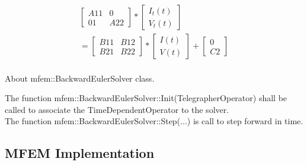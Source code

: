 \documentclass[12pt, letterpaper]{article}
\begin{document}
\begin{equation}
\begin{aligned}
		\begin{bmatrix}
			A11 & 0\\
           01 & A22
		\end{bmatrix}
		*
		\begin{bmatrix}
			I_{t}(t) \\
			V_{t}(t)
		\end{bmatrix}\\
		=
		\begin{bmatrix}
			B11 & B12 \\
			B21 & B22
		\end{bmatrix}
		*
		\begin{bmatrix}
			I(t) \\
			V(t)
		\end{bmatrix}
		+ 
		\begin{bmatrix}
			0 \\
			C2
		\end{bmatrix}
	\end{aligned}
\end{equation}\\


About mfem::BackwardEulerSolver class.

The function mfem::BackwardEulerSolver::Init(TelegrapherOperator) shall be called to associate the TimeDependentOperator to the solver.\\

The function mfem::BackwardEulerSolver::Step(...) is call to step forward in time.




\subsection{MFEM Implementation}
\end{document}
